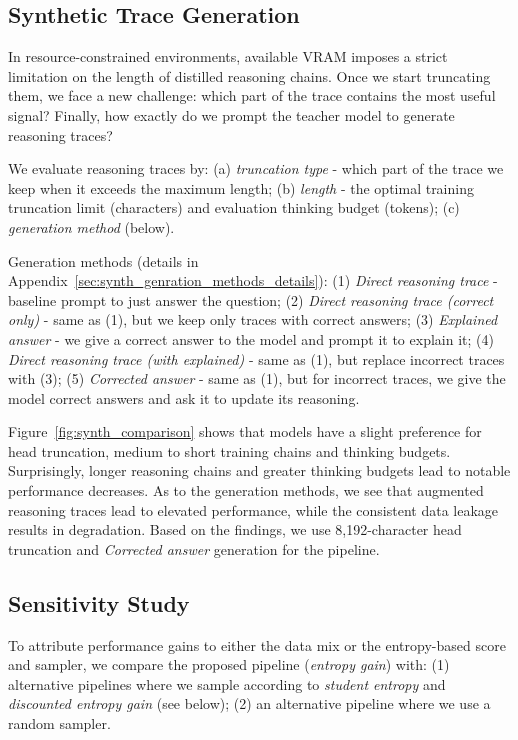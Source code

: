 \documentclass[11pt]{article}
\begin{document}
\subsection{Synthetic Trace Generation}
\label{sec:synth_trace_analysis}

In resource-constrained environments, available VRAM imposes a strict limitation on the length of distilled reasoning chains.
Once we start truncating them, we face a new challenge: which part of the trace contains the most useful signal?
Finally, how exactly do we prompt the teacher model to generate reasoning traces?

We evaluate reasoning traces by:
(a) \emph{truncation type} - which part of the trace we keep when it exceeds the maximum length;
(b) \emph{length} - the optimal training truncation limit (characters) and evaluation thinking budget (tokens);
(c) \emph{generation method} (below).

Generation methods (details in Appendix~\ref{sec:synth_genration_methods_details}):
(1) \emph{Direct reasoning trace} - baseline prompt to just answer the question;
(2) \emph{Direct reasoning trace (correct only)} - same as (1), but we keep only traces with correct answers;
(3) \emph{Explained answer} - we give a correct answer to the model and prompt it to explain it;
(4) \emph{Direct reasoning trace (with explained)} - same as (1), but replace incorrect traces with (3);
(5) \emph{Corrected answer} - same as (1), but for incorrect traces, we give the model correct answers and ask it to update its reasoning.

Figure~\ref{fig:synth_comparison} shows that models have a slight preference for head truncation, medium to short training chains and thinking budgets.
Surprisingly, longer reasoning chains and greater thinking budgets lead to notable performance decreases.
As to the generation methods, we see that augmented reasoning traces lead to elevated performance, while the consistent data leakage results in degradation.
Based on the findings, we use 8,192-character head truncation and \emph{Corrected answer} generation for the pipeline.

\subsection{Sensitivity Study}

To attribute performance gains to either the data mix or the entropy-based score and sampler, we compare the proposed pipeline (\emph{entropy gain}) with:
(1) alternative pipelines where we sample according to \emph{student entropy} and \emph{discounted entropy gain} (see below);
(2) an alternative pipeline where we use a random sampler.
\end{document}
